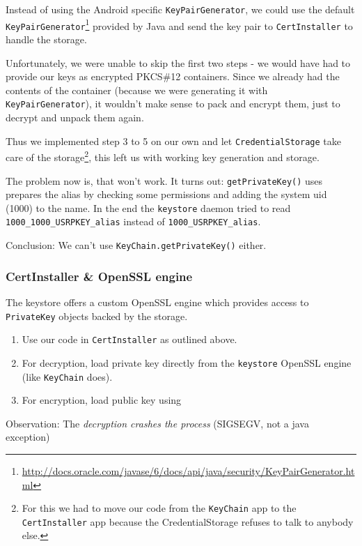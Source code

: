 \documentclass[a4paper,draft]{scrartcl}
\begin{document}
			Instead of using the Android specific \texttt{KeyPairGenerator}, we could use the default \texttt{KeyPairGenerator}\footnote{\url{http://docs.oracle.com/javase/6/docs/api/java/security/KeyPairGenerator.html}} provided by Java and send the key pair to \texttt{CertInstaller} to handle the storage.
			
			Unfortunately, we were unable to skip the first two steps - we would have had to provide our keys as encrypted PKCS\#12 containers. Since we already had the contents of the container (because we were generating it with \texttt{KeyPairGenerator}), it wouldn't make sense to pack and encrypt them, just to decrypt and unpack them again.
			
			Thus we implemented step 3 to 5 on our own and let \texttt{CredentialStorage} take care of the storage\footnote{For this we had to move our code from the \texttt{KeyChain} app to the \texttt{CertInstaller} app because the CredentialStorage refuses to talk to anybody else.}, this left us with working key generation and storage.
			
			The problem now is, that  won't work. It turns out: \texttt{getPrivateKey()} uses prepares the alias by checking some permissions and adding the system uid (1000) to the name. In the end the \texttt{keystore} daemon tried to read \texttt{1000\_1000\_USRPKEY\_alias} instead of \texttt{1000\_USRPKEY\_alias}.

			Conclusion: We can't use \texttt{KeyChain.getPrivateKey()} either.

		\pagebreak[4]
		\subsubsection{CertInstaller \& OpenSSL engine}
			The keystore offers a custom OpenSSL engine which provides access to \texttt{PrivateKey} objects backed by the storage.

			\begin{enumerate}
				\item Use our code in \texttt{CertInstaller} as outlined above.
				\item For decryption, load private key directly from the \texttt{keystore} OpenSSL engine (like \texttt{KeyChain} does).
				\item For encryption, load public key using 
			\end{enumerate}

			Observation:
			The \emph{decryption crashes the process} (SIGSEGV, not a java exception)
\end{document}
